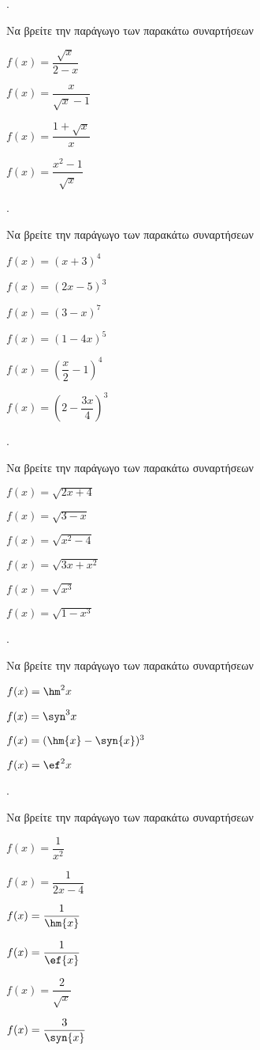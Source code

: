 \documentclass[11pt,a4paper,twocolumn]{article}
\newcounter{askhsh}
\newcommand{\askhsh}{\large\theaskhsh.\ \addtocounter{askhsh}{1}}
\begin{document}
\askhsh Να βρείτε την παράγωγο των παρακάτω συναρτήσεων
\begin{multicols}{2}
\begin{alist}
\item $ f(x)=\dfrac{\sqrt{x}}{2-x} $
\item $ f(x)=\dfrac{x}{\sqrt{x}-1} $
\item $ f(x)=\dfrac{1+\sqrt{x}}{x} $
\item $ f(x)=\dfrac{x^2-1}{\sqrt{x}} $
\end{alist}
\end{multicols}
\askhsh Να βρείτε την παράγωγο των παρακάτω συναρτήσεων
\begin{multicols}{2}
\begin{alist}
\item $ f(x)=(x+3)^4 $
\item $ f(x)=(2x-5)^3 $
\item $ f(x)=(3-x)^7 $
\item $ f(x)=(1-4x)^5 $
\item $ f(x)=\left(\dfrac{x}{2}-1\right)^4 $
\item $ f(x)=\left(2-\dfrac{3x}{4}\right)^3 $
\end{alist}
\end{multicols}
\askhsh Να βρείτε την παράγωγο των παρακάτω συναρτήσεων
\begin{multicols}{2}
\begin{alist}
\item $ f(x)=\sqrt{2x+4} $
\item $ f(x)=\sqrt{3-x} $
\item $ f(x)=\sqrt{x^2-4} $
\item $ f(x)=\sqrt{3x+x^2} $
\item $ f(x)=\sqrt{x^3} $
\item $ f(x)=\sqrt{1-x^3} $
\end{alist}
\end{multicols}
\askhsh Να βρείτε την παράγωγο των παρακάτω συναρτήσεων
\begin{alist}
\item $ f(x)=\hm^2{x} $
\item $ f(x)=\syn^3{x} $
\item $ f(x)=(\hm{x}-\syn{x})^3 $
\item $ f(x)=\ef^2{x} $
\end{alist}
\askhsh Να βρείτε την παράγωγο των παρακάτω συναρτήσεων
\begin{multicols}{2}
\begin{alist}
\item $ f(x)=\dfrac{1}{x^2} $
\item $ f(x)=\dfrac{1}{2x-4} $
\item $ f(x)=\dfrac{1}{\hm{x}} $
\item $ f(x)=\dfrac{1}{\ef{x}} $
\item $ f(x)=\dfrac{2}{\sqrt{x}} $
\item $ f(x)=\dfrac{3}{\syn{x}} $
\end{alist}
\end{multicols}
\end{document}

